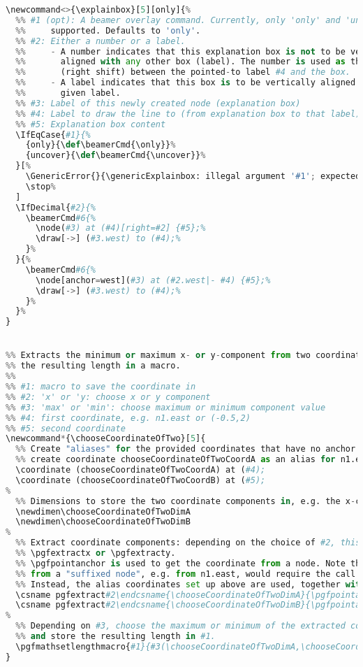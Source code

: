 {\begin{lstlisting}[language=Python,style=normal,escapechar=?,morekeywords={True, False}, mathescape]
\newcommand<>{\explainbox}[5][only]{%
  %% #1 (opt): A beamer overlay command. Currently, only 'only' and 'uncover' are 
  %%     supported. Defaults to 'only'.
  %% #2: Either a number or a label.
  %%     - A number indicates that this explanation box is not to be vertically 
  %%       aligned with any other box (label). The number is used as the distance
  %%       (right shift) between the pointed-to label #4 and the box.
  %%     - A label indicates that this box is to be vertically aligned with the
  %%       given label.
  %% #3: Label of this newly created node (explanation box)
  %% #4: Label to draw the line to (from explanation box to that label)
  %% #5: Explanation box content
  \IfEqCase{#1}{%
    {only}{\def\beamerCmd{\only}}%
    {uncover}{\def\beamerCmd{\uncover}}%
  }[%
    \GenericError{}{\genericExplainbox: illegal argument '#1'; expected 'only' or 'uncover'}{}{}%
    \stop%
  ]
  \IfDecimal{#2}{%
    \beamerCmd#6{%
      \node(#3) at (#4)[right=#2] {#5};%
      \draw[->] (#3.west) to (#4);%
    }%
  }{%
    \beamerCmd#6{%
      \node[anchor=west](#3) at (#2.west|- #4) {#5};%
      \draw[->] (#3.west) to (#4);%
    }%
  }%
}


%% Extracts the minimum or maximum x- or y-component from two coordinates and stores
%% the resulting length in a macro.
%%
%% #1: macro to save the coordinate in
%% #2: 'x' or 'y: choose x or y component
%% #3: 'max' or 'min': choose maximum or minimum component value
%% #4: first coordinate, e.g. n1.east or (-0.5,2)
%% #5: second coordinate
\newcommand*{\chooseCoordinateOfTwo}[5]{
  %% Create "aliases" for the provided coordinates that have no anchor suffix, e.g.
  %% create coordinate chooseCoordinateOfTwoCoordA as an alias for n1.east
  \coordinate (chooseCoordinateOfTwoCoordA) at (#4);
  \coordinate (chooseCoordinateOfTwoCoordB) at (#5);
%  
  %% Dimensions to store the two coordinate components in, e.g. the x-coordinate of n1.east
  \newdimen\chooseCoordinateOfTwoDimA
  \newdimen\chooseCoordinateOfTwoDimB
%
  %% Extract coordinate components: depending on the choice of #2, this is done via
  %% \pgfextractx or \pgfextracty.
  %% \pgfpointanchor is used to get the coordinate from a node. Note that getting the coordinate 
  %% from a "suffixed node", e.g. from n1.east, would require the call \pgfpointanchor{n1}{east}.
  %% Instead, the alias coordinates set up above are used, together with the anchor 'base'.
  \csname pgfextract#2\endcsname{\chooseCoordinateOfTwoDimA}{\pgfpointanchor{chooseCoordinateOfTwoCoordA}{base}}
  \csname pgfextract#2\endcsname{\chooseCoordinateOfTwoDimB}{\pgfpointanchor{chooseCoordinateOfTwoCoordB}{base}}
%
  %% Depending on #3, choose the maximum or minimum of the extracted coordinate components,
  %% and store the resulting length in #1.
  \pgfmathsetlengthmacro{#1}{#3(\chooseCoordinateOfTwoDimA,\chooseCoordinateOfTwoDimB)}
}


\end{lstlisting}}
